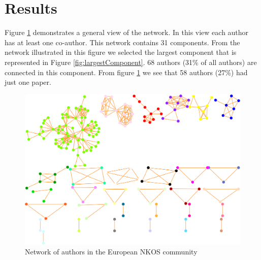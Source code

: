 \documentclass[runningheads,a4paper]{llncs}
\begin{document}
\section{Results}\label{results}

Figure \ref{fig:wholenet} demonstrates a general view of the network. In this view each author has at least one co-author. This network contains 31 components. From the network illustrated in this figure we selected the largest component that is represented in Figure \ref{fig:largestComponent}. 68 authors (31\% of all authors) are connected in this component. 
From figure \ref{fig:wholenet} we see that 58 authors (27\%) had just one paper.


\begin{figure}
	\centering
	\includegraphics[width=1.0\linewidth]{wholeNet}
	\vspace{-0.5em}
	\caption{Network of authors in the European NKOS community}
	\label{fig:wholenet}
	\vspace{-0.5em}
\end{figure}

\end{document}
